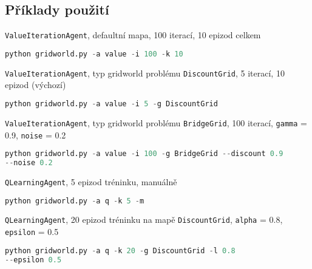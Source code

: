\subsection{Příklady použití}
\texttt{ValueIterationAgent}, defaultní mapa, 100 iterací, 10 epizod celkem
\begin{lstlisting}[language=Python,texcl=true]
python gridworld.py -a value -i 100 -k 10
\end{lstlisting}
\texttt{ValueIterationAgent}, typ gridworld problému \texttt{DiscountGrid}, 5 iterací, 10 epizod (výchozí)
\begin{lstlisting}[language=Python,texcl=true]
python gridworld.py -a value -i 5 -g DiscountGrid
\end{lstlisting}
\texttt{ValueIterationAgent}, typ gridworld problému \texttt{BridgeGrid}, 100 iterací, \texttt{gamma} = 0.9, \texttt{noise} =  0.2
\begin{lstlisting}[language=Python,texcl=true]
python gridworld.py -a value -i 100 -g BridgeGrid --discount 0.9
--noise 0.2
\end{lstlisting}
\texttt{QLearningAgent}, 5 epizod tréninku, manuálně
\begin{lstlisting}[language=Python,texcl=true]
python gridworld.py -a q -k 5 -m
\end{lstlisting}
\texttt{QLearningAgent}, 20 epizod tréninku na mapě \texttt{DiscountGrid},  \texttt{alpha} = 0.8, \texttt{epsilon} = 0.5
\begin{lstlisting}[language=Python,texcl=true]
python gridworld.py -a q -k 20 -g DiscountGrid -l 0.8
--epsilon 0.5
\end{lstlisting}

